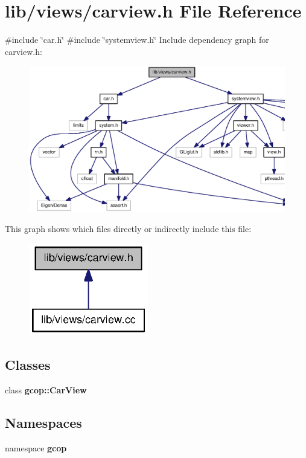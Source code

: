 \section{lib/views/carview.h \-File \-Reference}
\label{carview_8h}
{\ttfamily \#include \char`\"{}car.\-h\char`\"{}}\*
{\ttfamily \#include \char`\"{}systemview.\-h\char`\"{}}\*
\-Include dependency graph for carview.\-h\-:\nopagebreak
\begin{figure}[H]
\begin{center}
\leavevmode
\includegraphics[width=350pt]{carview_8h__incl}
\end{center}
\end{figure}
\-This graph shows which files directly or indirectly include this file\-:\nopagebreak
\begin{figure}[H]
\begin{center}
\leavevmode
\includegraphics[width=148pt]{carview_8h__dep__incl}
\end{center}
\end{figure}
\subsection*{\-Classes}
\begin{DoxyCompactItemize}
\item 
class {\bf gcop\-::\-Car\-View}
\end{DoxyCompactItemize}
\subsection*{\-Namespaces}
\begin{DoxyCompactItemize}
\item 
namespace {\bf gcop}
\end{DoxyCompactItemize}
